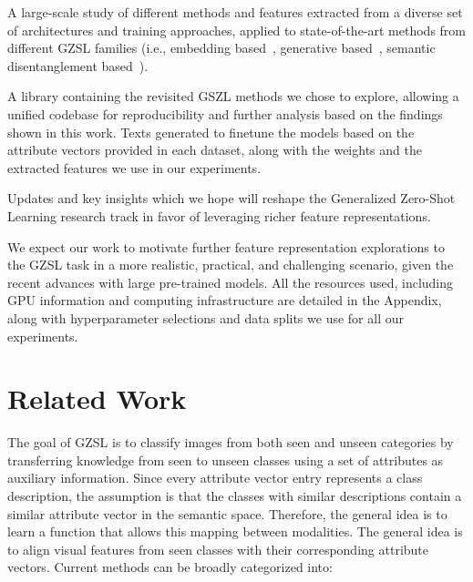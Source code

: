 \begin{compactitem}
\item A large-scale study of different methods and features extracted from a diverse set of architectures and training approaches, applied to state-of-the-art methods from different GZSL families (i.e., embedding based~\cite{ALE, ESZSL, DeViSE}, generative based~\cite{tfvaegan, CADA_VAE, CE}, semantic disentanglement based~\cite{Tong2019HierarchicalDO, Chen2021FREE, SDGZSL}). 


\item A library containing the revisited GSZL methods we chose to explore, allowing a unified codebase for reproducibility and further analysis based on the findings shown in this work. Texts generated to finetune the models based on the attribute vectors provided in each dataset, along with the weights and the extracted features we use in our experiments.

\item Updates and key insights which we hope will reshape the Generalized Zero-Shot Learning research track in favor of leveraging richer feature representations. 

\end{compactitem}

We expect our work to motivate further feature representation explorations to the GZSL task in a more realistic, practical, and challenging scenario, given the recent advances with large pre-trained models. All the resources used, including GPU information and computing infrastructure are detailed in the Appendix, along with hyperparameter selections and data splits we use for all our experiments.

\section{Related Work}

The goal of GZSL is to classify images from both seen and unseen categories by transferring knowledge from seen to unseen classes using a set of attributes as auxiliary information.
Since every attribute vector entry represents a class description, the assumption is that the classes with similar descriptions contain a similar attribute vector in the semantic space. Therefore, the general idea is to learn a function that allows this mapping between modalities. 
The general idea is to align visual features from seen classes with their corresponding attribute vectors. 
Current methods can be broadly categorized into:

